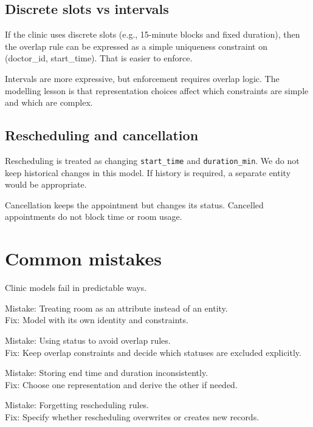 \subsection{Discrete slots vs intervals}
If the clinic uses discrete slots (e.g., 15-minute blocks and fixed duration), then the overlap rule can be expressed as a simple uniqueness constraint on (doctor\_id, start\_time).
That is easier to enforce.

Intervals are more expressive, but enforcement requires overlap logic.
The modelling lesson is that representation choices affect which constraints are simple and which are complex.

\subsection{Rescheduling and cancellation}
Rescheduling is treated as changing \texttt{start\_time} and \texttt{duration\_min}.
We do not keep historical changes in this model.
If history is required, a separate  entity would be appropriate.

Cancellation keeps the appointment but changes its status.
Cancelled appointments do not block time or room usage.

\section{Common mistakes}
Clinic models fail in predictable ways.

Mistake: Treating room as an attribute instead of an entity.\\
Fix: Model  with its own identity and constraints.

Mistake: Using status to avoid overlap rules.\\
Fix: Keep overlap constraints and decide which statuses are excluded explicitly.

Mistake: Storing end time and duration inconsistently.\\
Fix: Choose one representation and derive the other if needed.

Mistake: Forgetting rescheduling rules.\\
Fix: Specify whether rescheduling overwrites or creates new records.

